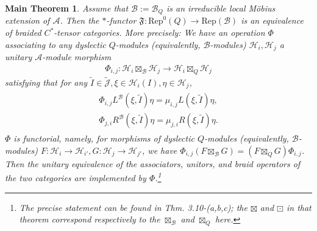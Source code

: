 \documentclass[11pt,b5paper,notitlepage]{article}
\theoremstyle{definition}
\theoremstyle{plain}
\newtheorem{Mthm}{Main Theorem}
\newcommand{\fk}{\mathfrak}
\newcommand{\mc}{\mathcal}
\newcommand{\wtd}{\widetilde}
\newcommand{\Rep}{\mathrm{Rep}}
\newcommand{\Jtd}{\widetilde{\mathcal J}}
\numberwithin{equation}{section}
\begin{document}
\begin{Mthm}\label{lb24}
Assume that $\mc B:=\mc B_Q$ is an irreducible local M\"obius extension of $\mc A$. Then the $*$-functor $\fk F:\Rep^0(Q)\rightarrow\Rep(\mc B)$ is an equivalence of braided $C^*$-tensor categories. More precisely: We have an operation $\Phi$ associating to any dyslectic $Q$-modules (equivalently, $\mc B$-modules) $\mc H_i,\mc H_j$ a unitary $\mc A$-module morphism
\begin{align}
\Phi_{i,j}:	\mc H_i\boxtimes_{\mc B}\mc H_j\rightarrow\mc H_i\boxtimes_Q\mc H_j
\end{align}
satisfying that for any $\wtd I\in\Jtd,\xi\in\mc H_i(I),\eta\in\mc H_j$,
\begin{gather}
\begin{gathered}
\Phi_{i,j}L^{\mc B}(\xi,\wtd I)\eta=\mu_{i,j}L(\xi,\wtd I)\eta,\\
\Phi_{j,i}R^{\mc B}(\xi,\wtd I)\eta=\mu_{j,i}R(\xi,\wtd I)\eta.
\end{gathered}	
\end{gather}
$\Phi$ is functorial, namely, for morphisms of dyslectic $Q$-modules (equivalently, $\mc B$-modules) $F:\mc H_i\rightarrow\mc H_{i'},G:\mc H_j\rightarrow\mc H_{j'}$, we have $\Phi_{i,j}(F\boxtimes_{\mc B}G)=(F\boxtimes_QG)\Phi_{i,j}$. Then  the unitary equivalence of the associators, unitors, and braid operators of the two categories are implemented by $\Phi$.\footnote{The precise statement can be found in \cite{Gui21a} Thm. 3.10-(a,b,c); the $\boxtimes$ and $\boxdot$ in that theorem correspond respectively to the $\boxtimes_{\mc B}$ and $\boxtimes_Q$ here.}
\end{Mthm}
\end{document}
